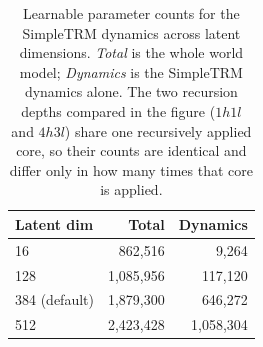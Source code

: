 %
%
%

\begin{table}[t]
  \centering
  \caption{Learnable parameter counts for the SimpleTRM dynamics across latent
  dimensions. \emph{Total} is the whole world model; \emph{Dynamics} is the
  SimpleTRM dynamics alone. The two recursion depths compared in the figure
  ($1h1l$ and $4h3l$) share one recursively applied core, so their counts are
  identical and differ only in how many times that core is applied.}
  \label{tab:simple-v-newt-params}
  \begin{tabular}{lrr}
    \toprule
    Latent dim & Total & Dynamics \\
    \midrule
    16            &   862,516 &     9,264 \\
    128           & 1,085,956 &   117,120 \\
    384 (default) & 1,879,300 &   646,272 \\
    512           & 2,423,428 & 1,058,304 \\
    \bottomrule
  \end{tabular}
\end{table}
